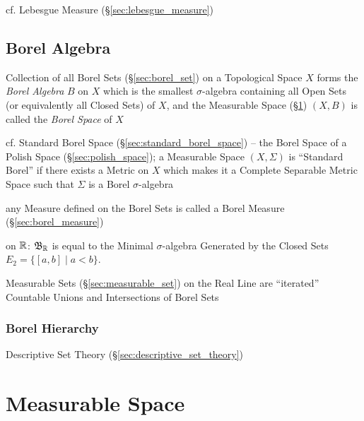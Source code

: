 cf. Lebesgue Measure (\S\ref{sec:lebesgue_measure})



\subsection{Borel Algebra}\label{sec:borel_algebra}

Collection of all Borel Sets (\S\ref{sec:borel_set}) on a Topological Space $X$
forms the \emph{Borel Algebra} $B$ on $X$ which is the smallest $\sigma$-algebra
containing all Open Sets (or equivalently all Closed Sets) of $X$, and the
Measurable Space (\S\ref{sec:measurable_space}) $(X,B)$ is called the
\emph{Borel Space} of $X$

\fist cf. Standard Borel Space (\S\ref{sec:standard_borel_space}) -- the Borel
Space of a Polish Space (\S\ref{sec:polish_space}); a Measurable Space $(X,
\Sigma)$ is ``Standard Borel'' if there exists a Metric on $X$ which makes it a
Complete Separable Metric Space such that $\Sigma$ is a Borel $\sigma$-algebra

any Measure defined on the Borel Sets is called a Borel Measure
(\S\ref{sec:borel_measure})

on $\mathbb{R}$: $\mathfrak{B}_{\mathbb{R}}$ is equal to the Minimal $\sigma$-algebra
Generated by the Closed Sets $E_2 = \{ [a,b] \;|\; a < b \}$.

Measurable Sets (\S\ref{sec:measurable_set}) on the Real Line are ``iterated''
Countable Unions and Intersections of Borel Sets



\subsubsection{Borel Hierarchy}\label{sec:borel_hierarchy}\hfill

\fist Descriptive Set Theory (\S\ref{sec:descriptive_set_theory})



\section{Measurable Space}\label{sec:measurable_space}

